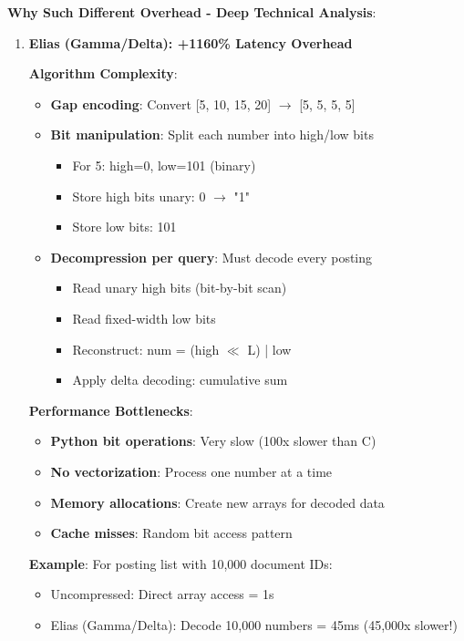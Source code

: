\documentclass[12pt,a4paper]{article}
\begin{document}
\textbf{Why Such Different Overhead - Deep Technical Analysis}:

\begin{enumerate}
    \item \textbf{Elias (Gamma/Delta): +1160\% Latency Overhead}
    
    \textbf{Algorithm Complexity}:
    \begin{itemize}
        \item \textbf{Gap encoding}: Convert [5, 10, 15, 20] $\rightarrow$ [5, 5, 5, 5]
        \item \textbf{Bit manipulation}: Split each number into high/low bits
        \begin{itemize}
            \item For 5: high=0, low=101 (binary)
            \item Store high bits unary: 0 $\rightarrow$ "1"
            \item Store low bits: 101
        \end{itemize}
        \item \textbf{Decompression per query}: Must decode every posting
        \begin{itemize}
            \item Read unary high bits (bit-by-bit scan)
            \item Read fixed-width low bits
            \item Reconstruct: num = (high $\ll$ L) | low
            \item Apply delta decoding: cumulative sum
        \end{itemize}
    \end{itemize}
    
    \textbf{Performance Bottlenecks}:
    \begin{itemize}
        \item \textbf{Python bit operations}: Very slow (100x slower than C)
        \item \textbf{No vectorization}: Process one number at a time
        \item \textbf{Memory allocations}: Create new arrays for decoded data
        \item \textbf{Cache misses}: Random bit access pattern
    \end{itemize}
    
    \textbf{Example}: For posting list with 10,000 document IDs:
    \begin{itemize}
        \item Uncompressed: Direct array access = 1\textmu s
        \item Elias (Gamma/Delta): Decode 10,000 numbers = 45ms (45,000x slower!)
    \end{itemize}
    

\end{enumerate}
\end{document}
